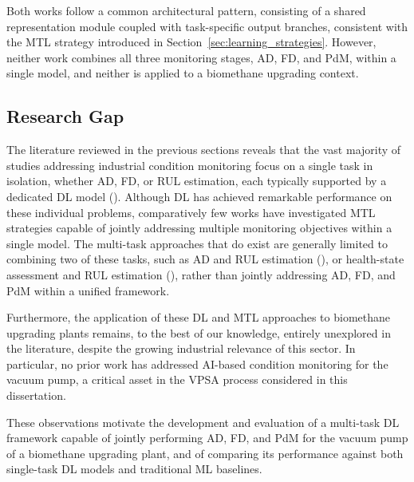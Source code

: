 Both works follow a common architectural pattern, consisting of a shared representation module coupled 
with task-specific output branches, consistent with the MTL strategy introduced in 
Section~\ref{sec:learning_strategies}. However, neither work combines all three monitoring stages, AD, FD, 
and PdM, within a single model, and neither is applied to a biomethane upgrading context.

\subsection{Research Gap}

The literature reviewed in the previous sections reveals that the vast majority of studies addressing industrial condition monitoring focus on a single task 
in isolation, whether AD, FD, or RUL estimation, each typically supported by a dedicated DL model 
(\cite{Khan2026,Zaidi2026}). Although DL has achieved remarkable performance on these individual problems, comparatively few works have investigated 
MTL strategies capable of jointly addressing multiple monitoring objectives within a single model. The multi-task approaches that do exist are 
generally limited to combining two of these tasks, such as AD and RUL estimation (\cite{Yin2026}), or health-state assessment 
and RUL estimation (\cite{Yan2023}), rather than jointly addressing AD, FD, and PdM within a 
unified framework.

Furthermore, the application of these DL and MTL approaches to biomethane upgrading plants remains, to the best of our knowledge, 
entirely unexplored in the literature, despite the growing industrial relevance of this sector. In particular, no prior work has addressed AI-based condition 
monitoring for the vacuum pump, a critical asset in the VPSA process considered in this dissertation.

These observations motivate the development and evaluation of a multi-task DL framework capable of jointly performing AD, FD, 
and PdM for the vacuum pump of a biomethane upgrading plant, and of comparing its performance against both single-task DL models and traditional ML baselines.